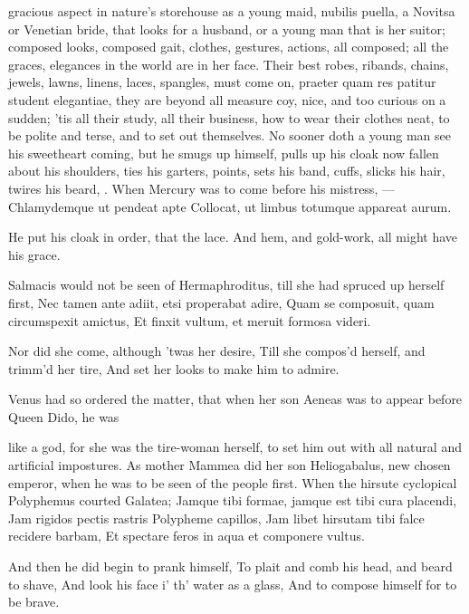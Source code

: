 {gracious aspect in nature's storehouse as a young maid, nubilis puella,
a Novitsa or Venetian bride, that looks for a husband, or a young man
that is her suitor; composed looks, composed gait, clothes, gestures,
actions, all composed; all the graces, elegances in the world are in
her face. Their best robes, ribands, chains, jewels, lawns, linens,
laces, spangles, must come on, praeter quam res patitur student
elegantiae, they are beyond all measure coy, nice, and too curious on a
sudden; 'tis all their study, all their business, how to wear their
clothes neat, to be polite and terse, and to set out themselves. No
sooner doth a young man see his sweetheart coming, but he smugs up
himself, pulls up his cloak now fallen about his shoulders, ties his
garters, points, sets his band, cuffs, slicks his hair, twires his
beard, \etc{}. When Mercury was to come before his mistress,
---Chlamydemque ut pendeat apte
Collocat, ut limbus totumque appareat aurum.

He put his cloak in order, that the lace.
And hem, and gold-work, all might have his grace.

Salmacis would not be seen of Hermaphroditus, till she had spruced up
herself first,
Nec tamen ante adiit, etsi properabat adire,
Quam se composuit, quam circumspexit amictus,
Et finxit vultum, et meruit formosa videri.

Nor did she come, although 'twas her desire,
Till she compos'd herself, and trimm'd her tire,
And set her looks to make him to admire.

Venus had so ordered the matter, that when her son Aeneas was to
appear before Queen Dido, he was

like a god, for she was the tire-woman herself, to set him out with all
natural and artificial impostures. As mother Mammea did her son
Heliogabalus, new chosen emperor, when he was to be seen of the people
first. When the hirsute cyclopical Polyphemus courted Galatea;
Jamque tibi formae, jamque est tibi cura placendi,
Jam rigidos pectis rastris Polypheme capillos,
Jam libet hirsutam tibi falce recidere barbam,
Et spectare feros in aqua et componere vultus.

And then he did begin to prank himself,
To plait and comb his head, and beard to shave,
And look his face i' th' water as a glass,
And to compose himself for to be brave.

}
